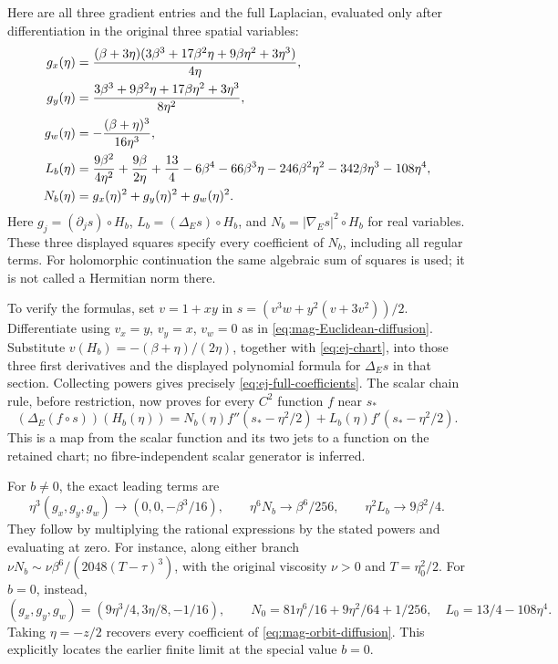 Here are all three gradient entries and the full Laplacian, evaluated
only after differentiation in the original three spatial variables:
\begin{align}
 g_x(\eta)&=\frac{(\beta+3\eta)
 (3\beta^3+17\beta^2\eta+9\beta\eta^2+3\eta^3)}{4\eta},\notag\\
 g_y(\eta)&=\frac{3\beta^3+9\beta^2\eta+17\beta\eta^2+3\eta^3}
                         {8\eta^2},\notag\\
 g_w(\eta)&=-\frac{(\beta+\eta)^3}{16\eta^3},\notag\\
 L_b(\eta)&=\frac{9\beta^2}{4\eta^2}+\frac{9\beta}{2\eta}
 +\frac{13}{4}-6\beta^4-66\beta^3\eta-246\beta^2\eta^2
                 -342\beta\eta^3-108\eta^4,\notag\\
 N_b(\eta)&=g_x(\eta)^2+g_y(\eta)^2+g_w(\eta)^2.
 \label{eq:ej-full-coefficients}
\end{align}
Here $g_j=(\partial_j s)\circ H_b$, $L_b=(\Delta_Es)\circ H_b$,
and $N_b=|\nabla_Es|^2\circ H_b$ for real variables. These three
displayed squares specify every coefficient of $N_b$, including
all regular terms. For holomorphic continuation the same algebraic
sum of squares is used; it is not called a Hermitian norm there.

To verify the formulas, set $v=1+xy$ in
$s=(v^3w+y^2(v+3v^2))/2$. Differentiate using $v_x=y$, $v_y=x$,
$v_w=0$ as in \eqref{eq:mag-Euclidean-diffusion}. Substitute
$v(H_b)=-(\beta+\eta)/(2\eta)$, together with
\eqref{eq:ej-chart}, into those three first derivatives and the
displayed polynomial formula for $\Delta_Es$ in that section.
Collecting powers gives precisely \eqref{eq:ej-full-coefficients}.
The scalar chain rule, before restriction, now proves for every
$C^2$ function $f$ near $s_*$
\begin{equation}
 (\Delta_E(f\circ s))(H_b(\eta))
 =N_b(\eta)f''(s_*-\eta^2/2)+L_b(\eta)f'(s_*-\eta^2/2).
 \label{eq:ej-diffusion}
\end{equation}
This is a map from the scalar function and its two jets to a function
on the retained chart; no fibre-independent scalar generator is inferred.

For $b\ne0$, the exact leading terms are
\begin{equation}
 \eta^3(g_x,g_y,g_w)\longrightarrow(0,0,-\beta^3/16),\qquad
 \eta^6N_b\longrightarrow\beta^6/256,\qquad
 \eta^2L_b\longrightarrow9\beta^2/4.
 \label{eq:ej-leading}
\end{equation}
They follow by multiplying the rational expressions by the stated
powers and evaluating at zero. For instance, along either branch
$\nu N_b\sim\nu\beta^6/(2048(T-\tau)^3)$, with the original
viscosity $\nu>0$ and $T=\eta_0^2/2$. For $b=0$, instead,
\[
 (g_x,g_y,g_w)=(9\eta^3/4,3\eta/8,-1/16),\qquad
 N_0=81\eta^6/16+9\eta^2/64+1/256,\quad L_0=13/4-108\eta^4.
\]
Taking $\eta=-z/2$ recovers every coefficient of
\eqref{eq:mag-orbit-diffusion}. This explicitly locates the earlier
finite limit at the special value $b=0$.

